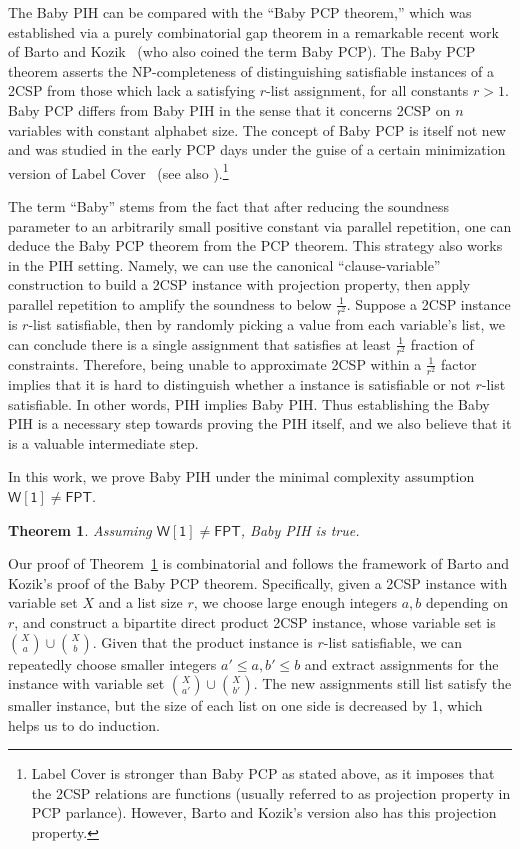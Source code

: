 \documentclass[10pt,a4paper]{article}
\newtheorem{theorem}{Theorem}
\newcommand{\wone}{\mathsf{W[1]}}
\newcommand{\fpt}{\mathsf{FPT}}
\begin{document}
The Baby PIH can be compared with the ``Baby PCP theorem,'' which was established via a purely combinatorial gap theorem in a remarkable recent work of Barto and Kozik~\cite{BK22} (who also coined the term Baby PCP). 
The Baby PCP theorem asserts the NP-completeness of distinguishing satisfiable instances of a 2CSP from those which lack a satisfying $r$-list assignment, for all constants $r > 1$.   Baby PCP differs from Baby PIH in the sense that it concerns 2CSP on $n$ variables with constant alphabet size.  The concept of Baby PCP is itself not new and was studied in the early PCP days under the guise of a certain minimization version of Label Cover~\cite{ABSS97} (see also \cite{DS04}).\footnote{Label Cover is stronger than Baby PCP as stated above, as it imposes that the 2CSP relations are functions (usually referred to as projection property in PCP parlance). However, Barto and Kozik's version also has this projection property.} 

The term ``Baby'' stems from the fact that after reducing the soundness parameter to an arbitrarily small positive constant via parallel repetition, one can deduce the Baby PCP theorem from the PCP theorem.  This strategy also works in the PIH setting. Namely, we can use the canonical ``clause-variable'' construction to build a 2CSP instance with projection property, then apply parallel repetition \cite{Rao11} to amplify the soundness to below $\frac{1}{r^2}$. Suppose a 2CSP instance is $r$-list satisfiable, then by randomly picking a value from each variable's list, we can conclude there is a single assignment that satisfies at least $\frac{1}{r^2}$ fraction of constraints. Therefore, being unable to approximate 2CSP within a $\frac{1}{r^2}$ factor implies that it is hard to distinguish whether a instance is satisfiable or not $r$-list satisfiable. In other words, PIH implies Baby PIH. Thus establishing the Baby PIH is a necessary step towards proving the PIH itself, and we also believe that it is a valuable intermediate step. 

In this work, we prove Baby PIH under the minimal complexity assumption $\wone\neq\fpt$. 

\begin{theorem}
\label{thm:main-intro}
    Assuming $\wone\neq\fpt$, Baby PIH is true.
\end{theorem}

Our proof of Theorem~\ref{thm:main-intro} is combinatorial and follows the framework of Barto and Kozik's proof of the Baby PCP theorem. Specifically, given a 2CSP instance with variable set $X$ and a list size $r$, we choose large enough integers $a,b$ depending on $r$, and construct a bipartite direct product 2CSP instance, whose variable set is $\binom{X}{a}\cup\binom{X}{b}$. Given that the product instance is $r$-list satisfiable, we can repeatedly choose smaller integers $a' \le a, b' \le b$ and extract assignments for the instance with variable set $\binom{X}{a'}\cup \binom{X}{b'}$. The new assignments still list satisfy the smaller instance, but the size of each list on one side is decreased by 1, which helps us to do induction.
\end{document}
